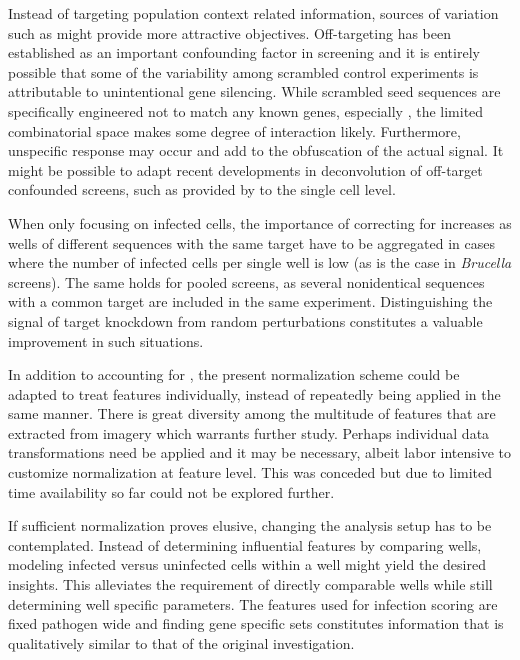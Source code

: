 Instead of targeting population context related information, sources of variation such as  might provide more attractive objectives. Off-targeting has been established as an important confounding factor in  screening and it is entirely possible that some of the variability among scrambled control experiments is attributable to unintentional gene silencing. While scrambled seed sequences are specifically engineered not to match any known genes, especially , the limited combinatorial space makes some degree of interaction likely. Furthermore, unspecific response may occur and add to the obfuscation of the actual signal. It might be possible to adapt recent developments in deconvolution of off-target confounded  screens, such as provided by \citet{Schmich2015} to the single cell level.

When only focusing on infected cells, the importance of correcting for  increases as wells of different sequences with the same target have to be aggregated in cases where the number of infected cells per single well is low (as is the case in \textit{Brucella} screens). The same holds for pooled  screens, as several nonidentical sequences with a common target are included in the same experiment. Distinguishing the signal of target knockdown from random perturbations constitutes a valuable improvement in such situations.

In addition to accounting for , the present normalization scheme could be adapted to treat features individually, instead of repeatedly being applied in the same manner. There is great diversity among the multitude of features that are extracted from imagery which warrants further study. Perhaps individual data transformations need be applied and it may be necessary, albeit labor intensive to customize normalization at feature level. This was conceded but due to limited time availability so far could not be explored further.

If sufficient normalization proves elusive, changing the analysis setup has to be contemplated. Instead of determining influential features by comparing wells, modeling infected versus uninfected cells within a well might yield the desired insights. This alleviates the requirement of directly comparable wells while still determining well specific parameters. The features used for infection scoring are fixed pathogen wide and finding gene specific sets constitutes information that is qualitatively similar to that of the original investigation.

